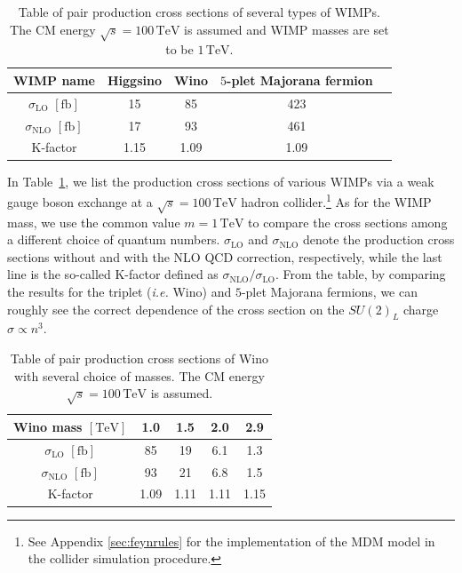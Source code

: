 \documentclass[12pt,twoside,book]{article}
\begin{document}
\begin{table}[t]
  \centering
  \begin{tabular}{c|cccc}
    WIMP name & Higgsino & Wino & $5$-plet Majorana fermion \\ \hline
    $\sigma_{\mathrm{LO}}$ $[\mathrm{fb}]$ & 15 & 85 & 423 \\
    $\sigma_{\mathrm{NLO}}$ $[\mathrm{fb}]$ & 17 & 93 & 461 \\ \hline
    K-factor & 1.15 & 1.09 & 1.09
  \end{tabular}
  \caption{
    Table of pair production cross sections of several types of WIMPs.
    The CM energy $\sqrt{s} = 100\,\mathrm{TeV}$ is assumed and WIMP masses are set to be $1\,\mathrm{TeV}$.
  }
  \label{tab:cross_section_WIMPs}
\end{table}

In Table~\ref{tab:cross_section_WIMPs}, we list the production cross sections of various WIMPs via a weak gauge boson exchange at a $\sqrt{s} = 100\,\mathrm{TeV}$ hadron collider.\footnote{
  See Appendix \ref{sec:feynrules} for the implementation of the MDM model in the collider simulation procedure.
}
As for the WIMP mass, we use the common value $m = 1\,\mathrm{TeV}$ to compare the cross sections among a different choice of quantum numbers.
$\sigma_{\mathrm{LO}}$ and $\sigma_{\mathrm{NLO}}$ denote the production cross sections without and with the NLO QCD correction, respectively, while the last line is the so-called K-factor defined as $\sigma_{\mathrm{NLO}} / \sigma_{\mathrm{LO}}$.
From the table, by comparing the results for the triplet (\textit{i.e.} Wino) and $5$-plet Majorana fermions, we can roughly see the correct dependence of the cross section on the $SU(2)_L$ charge $\sigma \propto n^3$.

\begin{table}[t]
  \centering
  \begin{tabular}{c|cccc}
    Wino mass $\mathrm{[TeV]}$ & 1.0 & 1.5 & 2.0 & 2.9 \\ \hline
    $\sigma_{\mathrm{LO}}$ $[\mathrm{fb}]$ & 85 & 19 & 6.1 & 1.3\\
    $\sigma_{\mathrm{NLO}}$ $[\mathrm{fb}]$ & 93 & 21 & 6.8 & 1.5 \\ \hline
    K-factor & 1.09 & 1.11 & 1.11 & 1.15
  \end{tabular}
  \caption{
    Table of pair production cross sections of Wino with several choice of masses.
    The CM energy $\sqrt{s} = 100\,\mathrm{TeV}$ is assumed.
  }
  \label{tab:cross_section_Wino_mass}
\end{table}
\end{document}
